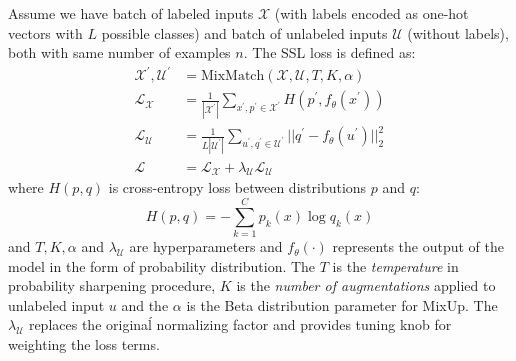 Assume we have batch of labeled inputs $\mathcal{X}$ (with labels encoded as one-hot vectors with $L$ possible classes) and batch of unlabeled inputs $\mathcal{U}$ 
(without labels), both with same number of examples $n$. The SSL loss is defined as:
\begin{align*}
    \mathcal{X}^\prime,\mathcal{U}^\prime &= \text{MixMatch}(\mathcal{X}, \mathcal{U}, T, K, \alpha)\\
    \mathcal{L}_{\mathcal{X}} &= \frac{1}{|\mathcal{X}^\prime|}\sum_{x^\prime,p^\prime \in \mathcal{X}^\prime} H(p^\prime,f_\theta(x^\prime)) \\
    \mathcal{L}_{\mathcal{U}} &= \frac{1}{L|\mathcal{U}^\prime|}\sum_{u^\prime,q^\prime \in \mathcal{U}^\prime} ||q^\prime - f_\theta(u^\prime)||_2^2 \\
    \mathcal{L} &= \mathcal{L}_{\mathcal{X}} + \lambda_\mathcal{U} \mathcal{L}_{\mathcal{U}}
\end{align*}
where $H(p,q)$ is cross-entropy loss between distributions $p$ and $q$:
\begin{equation*}
    H(p,q) = -\sum_{k=1}^{C} p_k(x) \log q_k(x)
\end{equation*}
and $T,K,\alpha$ and $\lambda_\mathcal{U}$ are hyperparameters and $f_\theta(\cdot)$ represents the 
output of the model in the form of probability distribution. The $T$ is the \textit{temperature} in probability sharpening procedure, $K$ is the \textit{number of augmentations} applied to
unlabeled input $u$ and the $\alpha$ is the Beta distribution parameter for MixUp. The $\lambda_\mathcal{U}$ replaces the originaĺ normalizing factor and provides tuning knob for 
weighting the loss terms. 

